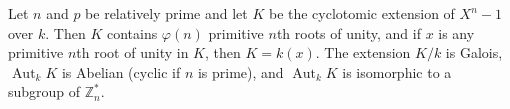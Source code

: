Let $n$ and $p$ be relatively prime and let $K$ be the cyclotomic extension of $X^n - 1$ over $k$. Then $K$ contains $\varphi(n)$ primitive $n$th roots of unity, and if $x$ is any primitive $n$th root of unity in $K$, then $K = k(x)$. The extension $K/k$ is Galois, $\operatorname{Aut}_k K$ is Abelian (cyclic if $n$ is prime), and $\operatorname{Aut}_k K$ is isomorphic to a subgroup of $\mathbb{Z}_n^*$.
